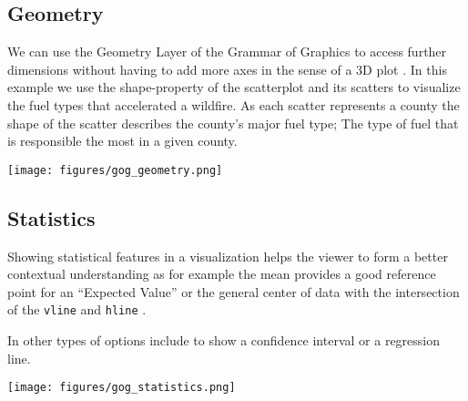 \vspace{-2mm}

\subsection*{Geometry}
\vspace{-2mm}
\begin{minipage}[t]{0.6\textwidth}
    We can use the Geometry Layer of the Grammar of Graphics to access further dimensions without having to
    add more axes in the sense of a 3D plot \cite{wilkinsonGeometry2005}. In this example we use the shape-property of the scatterplot and
    its scatters to visualize the fuel types that accelerated a wildfire. As each scatter represents a county
    the shape of the scatter describes the county's major fuel type; The type of fuel that is responsible the most
    in a given county.
    \hspace{1cm}
\end{minipage}%
\begin{minipage}[t]{0.4\textwidth}
    \vspace{-20pt}
    \texttt{[image: figures/gog\_geometry.png]}
\end{minipage}

\vspace{-2mm}

\subsection*{Statistics}
\vspace{-2mm}
\begin{minipage}[t]{0.6\textwidth}
    Showing statistical features in a visualization helps the viewer to form a better
    contextual understanding as for example the mean provides a good reference point for
    an ``Expected Value'' or the general center of data with the intersection of the \texttt{vline} and \texttt{hline} \cite{wilkinsonStatistics2005}.
    
    In other types of  options include to show a confidence interval or a regression line.
    \hspace{1cm}
\end{minipage}%
\begin{minipage}[t]{0.4\textwidth}
    \vspace{-20pt}
    \texttt{[image: figures/gog\_statistics.png]}
\end{minipage}

